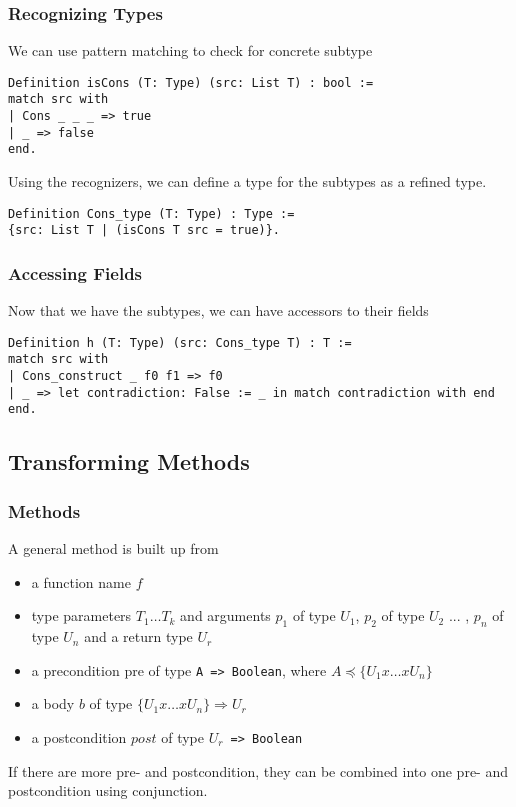 \documentclass{beamer}
\newcommand{\scalaInline}[1]{\lstinline[style=myScalastyle]|#1|}
\begin{document}
\begin{frame}[fragile]
	\frametitle{Recognizing Types}
	
	We can use pattern matching to check for concrete subtype
	
\begin{lstlisting}[style=myCoqstyle]  
Definition isCons (T: Type) (src: List T) : bool :=
match src with
| Cons _ _ _ => true
| _ => false
end.
\end{lstlisting}

Using the recognizers, we can define a type for the subtypes as a refined type.

\begin{lstlisting}[style=myCoqstyle]  
Definition Cons_type (T: Type) : Type :=
{src: List T | (isCons T src = true)}. 
\end{lstlisting}
	
\end{frame}

\begin{frame}[fragile]
\frametitle{Accessing Fields}

Now that we have the subtypes, we can have accessors to their fields

\begin{lstlisting}[style=myCoqstyle]  
Definition h (T: Type) (src: Cons_type T) : T :=
match src with
| Cons_construct _ f0 f1 => f0
| _ => let contradiction: False := _ in match contradiction with end
end. 
\end{lstlisting}

\end{frame}


\subsection{Transforming Methods}

\begin{frame}[fragile]
\frametitle{Methods}
A general method is built up from
\begin{itemize}
	\item a function name $f$
	\item type parameters $T_1 \ldots T_k$ and arguments $p_1$ of type $U_1$, $p_2$ of type $U_2$ ... , $p_n$ of type $U_n$ and a return type $U_r$
	\item a precondition pre of type \scalaInline{A => Boolean}, where $A \preceq \{U_1 x \ldots x U_n\}$
	\item a body $b$ of type $\{U_1 x \ldots x U_n\} \Longrightarrow U_r$
	\item a postcondition $post$ of type $U_r$\scalaInline{ => Boolean } 
\end{itemize}

If there are more pre- and postcondition, they can be combined into one pre- and postcondition using conjunction.

\end{frame}
\end{document}
